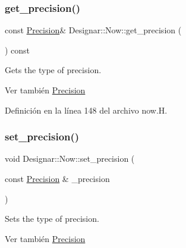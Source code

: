 \mbox{\label{class_designar_1_1_now_a5f1a92bbd3bc6777749a0794d42b67c6}} 
\subsubsection{\texorpdfstring{get\+\_\+precision()}{get\_precision()}}
{\footnotesize\ttfamily const \hyperlink{class_designar_1_1_now_a3c9f5e57907c88cbe63c70a64638c072}{Precision}\& Designar\+::\+Now\+::get\+\_\+precision (\begin{DoxyParamCaption}{ }\end{DoxyParamCaption}) const\hspace{0.3cm}{\ttfamily [inline]}}

Gets the type of precision.

\begin{DoxySeeAlso}{Ver también}
\hyperlink{class_designar_1_1_now_a3c9f5e57907c88cbe63c70a64638c072}{Precision} 
\end{DoxySeeAlso}


Definición en la línea 148 del archivo now.\+H.

\mbox{\label{class_designar_1_1_now_aab4958d10eb970d40f3dcdf78a5f42e3}} 
\subsubsection{\texorpdfstring{set\+\_\+precision()}{set\_precision()}}
{\footnotesize\ttfamily void Designar\+::\+Now\+::set\+\_\+precision (\begin{DoxyParamCaption}\item[{const \hyperlink{class_designar_1_1_now_a3c9f5e57907c88cbe63c70a64638c072}{Precision} \&}]{\+\_\+precision }\end{DoxyParamCaption})\hspace{0.3cm}{\ttfamily [inline]}}

Sets the type of precision.

\begin{DoxySeeAlso}{Ver también}
\hyperlink{class_designar_1_1_now_a3c9f5e57907c88cbe63c70a64638c072}{Precision} 
\end{DoxySeeAlso}


